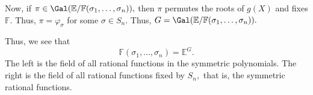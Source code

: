 \begin{ex}
    Now, if $\pi \in \Gal(\mathbb{E}/\mathbb{F}(\sigma_1, \ldots, \sigma_n)),$ then $\pi$ permutes the roots of $g(X)$ and fixes $\mathbb{F}.$ Thus, $\pi = \varphi_\sigma$ for some $\sigma \in S_n.$ Thus, $G = \Gal(\mathbb{E}/\mathbb{F}(\sigma_1, \ldots, \sigma_n)).$

    Thus, we see that
    \begin{equation*} 
        \mathbb{F}(\sigma_1, \ldots, \sigma_n) = \mathbb{E}^G.
    \end{equation*}
    The left is the field of all rational functions in the symmetric polynomials. The right is the field of all rational functions fixed by $S_n,$ that is, the symmetric rational functions.
\end{ex}
